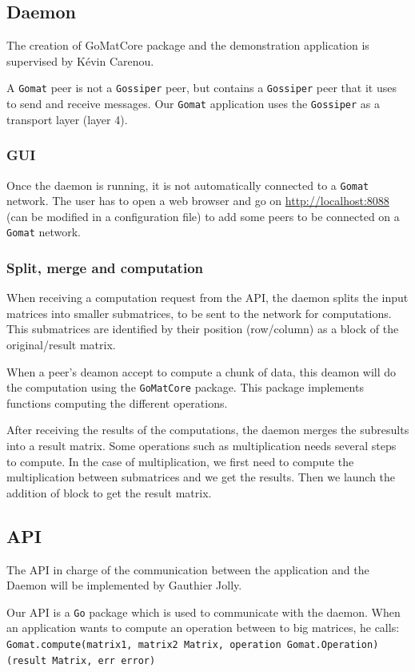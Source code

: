 \documentclass[a4paper,12pt]{article}
\newcommand{\Gossiper}{\texttt{Gossiper}\xspace}
\newcommand{\Gomat}{\texttt{Gomat}\xspace}
\newcommand{\Go}{\texttt{Go}\xspace}
\begin{document}
        \subsection{Daemon}
        The creation of GoMatCore package and the demonstration application is supervised by Kévin Carenou.

        A \Gomat peer is not a \Gossiper peer, but contains a \Gossiper peer that it uses to send and receive messages. Our \Gomat application uses the \Gossiper as a transport layer (layer 4).

        \subsubsection{GUI}
        Once the daemon is running, it is not automatically connected to a \Gomat network. The user has to open a web browser and go on \url{http://localhost:8088} (can be modified in a configuration file) to add some peers to be connected on a
    \Gomat network.

    \subsubsection{Split, merge and computation}
    When receiving a computation request from the API, the daemon splits the input matrices into smaller submatrices, to be sent to the network for computations. This submatrices are identified by their position (row/column) as a block of the original/result matrix.

    When a peer's deamon accept to compute a chunk of data, this deamon will do the computation using the \texttt{GoMatCore} package. This package implements functions computing the different operations.

    After receiving the results of the computations, the daemon merges the subresults into a result matrix. Some operations such as multiplication needs several steps to compute. In the case of multiplication, we first need to compute the multiplication between submatrices and we get the results. Then we launch the addition of block to get the result matrix.

    \subsection{API}
    The API in charge of the communication between the application and the Daemon will be implemented by Gauthier Jolly.

    Our API is a \Go package which is used to communicate with the daemon. When an application wants to compute an operation between to big matrices, he calls:\\
    \texttt{Gomat.compute(matrix1, matrix2 Matrix, operation Gomat.Operation) (result Matrix, err error)}
\end{document}
